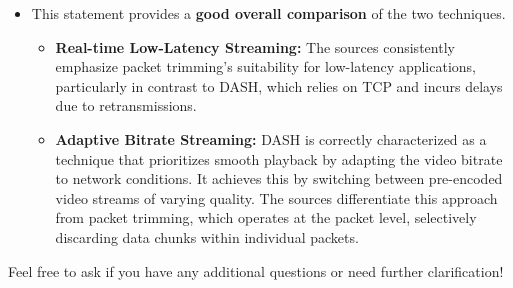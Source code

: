 \documentclass[
]{article}
\begin{document}
\begin{itemize}
  \begin{itemize}
  
  \item
    This statement provides a \textbf{good overall comparison} of the
    two techniques.

    \begin{itemize}
    
    \item
      \textbf{Real-time Low-Latency Streaming:} The sources consistently
      emphasize packet trimming's suitability for low-latency
      applications, particularly in contrast to DASH, which relies on
      TCP and incurs delays due to retransmissions.
    \item
      \textbf{Adaptive Bitrate Streaming:} DASH is correctly
      characterized as a technique that prioritizes smooth playback by
      adapting the video bitrate to network conditions. It achieves this
      by switching between pre-encoded video streams of varying quality.
      The sources differentiate this approach from packet trimming,
      which operates at the packet level, selectively discarding data
      chunks within individual packets.
    \end{itemize}
  \end{itemize}
\end{itemize}

Feel free to ask if you have any additional questions or need further
clarification!
\end{document}
